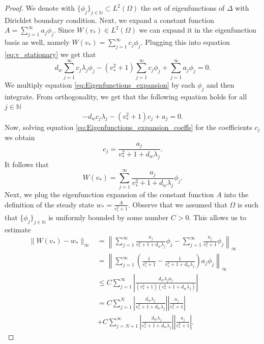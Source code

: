 \documentclass[preprint,12pt]{elsarticle}
\theoremstyle{plain}
\theoremstyle{definition}
\theoremstyle{remark}
\begin{document}
\begin{proof}
    We denote with $\{\phi_j\}_{j \in \mathbb{N}} \subset L^2(\Omega)$ the set of eigenfunctions of $\Delta$ with Dirichlet boundary condition. Next, 
    we expand a constant function $A = \sum_{j=1}^\infty a_j \phi_j$. Since $W(v_*) \in L^2(\Omega)$ we can expand it in the eigenfunction basis as well, namely $W(v_*) = \sum_{j=1}^\infty c_j \phi_j$. Plugging this into equation \eqref{eq:v_stationary} we get that
    \begin{equation}
        \label{eq:Eigenfunctions_expansion}
        d_w\sum_{j=1}^\infty c_j \lambda_j \phi_j - (v_*^2 + 1) \sum_{j=1}^\infty c_j \phi_j + \sum_{j=1}^\infty a_j \phi_j = 0.
    \end{equation}
    We multiply equation \eqref{eq:Eigenfunctions_expansion} by each $\phi_j$ and then integrate. From orthogonality, we get that the following equation holds for all $j \in \mathbb{N}$
    \begin{equation}
        \label{eq:Eigenfunctions_expansion_coeffs}
        -d_w c_j\lambda_j - (v_*^2+1) c_j + a_j = 0.
    \end{equation}
    Now, solving equation \eqref{eq:Eigenfunctions_expansion_coeffs} for the coefficients $c_j$ we obtain
    \begin{equation*}
        c_j = \frac{a_j}{v_*^2 + 1 + d_w\lambda_j}.
    \end{equation*}
    It follows that
    \begin{equation*}
        W(v_*) = \sum_{j=1}^\infty \frac{a_j}{v_*^2 + 1 + d_w\lambda_j} \phi_j.
    \end{equation*}
    Next, we plug the eigenfunction expansion of the constant function $A$ into the definition of the steady state $w_* = \frac{A}{v_*^2 + 1}$. Observe that we assumed that $\Omega$ is such that $\{\phi_j\}_{j \in \mathbb{N}}$ is uniformly bounded by some number $C > 0$. This allows us to estimate
\begin{align*}
    \|W(v_*) - w_*\|_\infty 
    &= 
    \left\|
        \sum_{j=1}^\infty 
        \frac{a_j}{v_*^2 + 1 + d_w \lambda_j} \phi_j 
        - 
        \sum_{j=1}^\infty 
        \frac{a_j}{v_*^2 + 1} \phi_j
    \right\|_\infty 
    \\[6pt]
    &=
    \left\|
        \sum_{j=1}^\infty
        \left(
            \frac{1}{v_*^2 + 1} 
            - 
            \frac{1}{v_*^2 + 1 + d_w \lambda_j}
        \right) 
        a_j \phi_j
    \right\|_\infty
    \\[6pt]
    &\leq
    C 
    \sum_{j=1}^\infty 
    \left| 
        \frac{d_w \lambda_j a_j}{(v_*^2 + 1)(v_*^2 + 1 + d_w \lambda_j)}
    \right|
    \\[6pt]
    &=
    C 
    \sum_{j=1}^N 
    \left| 
        \frac{d_w \lambda_j}{v_*^2 + 1 + d_w \lambda_j}
    \right|
    \left| 
        \frac{a_j}{v_*^2 + 1} 
    \right|
    \\[6pt]
    &+
    C
    \sum_{j=N+1}^\infty 
    \left| 
        \frac{d_w \lambda_j}{v_*^2 + 1 + d_w \lambda_j}
    \right|
    \left| 
        \frac{a_j}{v_*^2 + 1} 
    \right|.
\end{align*}


\end{proof}
\end{document}
